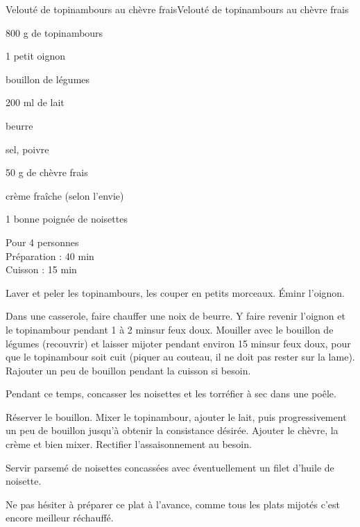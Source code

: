 \begin{recette}{Velouté de topinambours au chèvre frais}{Velouté de topinambours au chèvre frais}

\begin{ingredients}
800 g de topinambours\par
1 petit oignon\par
bouillon de légumes\par
200 ml de lait\par
beurre\par
sel, poivre\par
50 g de chèvre frais\par
crème fraîche (selon l'envie)\par
1 bonne poignée de noisettes\par
\end{ingredients}

\begin{infos}
Pour 4 personnes\\
Préparation : 40 min\\
Cuisson : 15 min\\
\end{infos}

\begin{etapes}
\item Laver et peler les topinambours, les couper en petits morceaux. Éminr l'oignon.
\item Dans une casserole, faire chauffer une noix de beurre. Y faire revenir l'oignon et le topinambour pendant 1 à 2 minsur feux doux. Mouiller avec le bouillon de légumes (recouvrir) et laisser mijoter pendant environ 15 minsur feux doux, pour que le topinambour soit cuit (piquer au couteau, il ne doit pas rester sur la lame). Rajouter un peu de bouillon pendant la cuisson si besoin.
\item Pendant ce temps, concasser les noisettes et les torréfier à sec dans une poêle.
\item Réserver le bouillon. Mixer le topinambour, ajouter le lait, puis progressivement un peu de bouillon jusqu'à obtenir la consistance désirée. Ajouter le chèvre, la crème et bien mixer. Rectifier l'assaisonnement au besoin.
\item Servir parsemé de noisettes concassées avec éventuellement un filet d'huile de noisette.
\end{etapes}

\begin{conseils}
Ne pas hésiter à préparer ce plat à l'avance, comme tous les plats mijotés c'est encore meilleur réchauffé.
\end{conseils}

\end{recette}